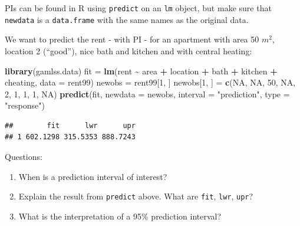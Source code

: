 \documentclass[
  ignorenonframetext,
]{beamer}
\newenvironment{Shaded}{\begin{snugshade}}{\end{snugshade}}
\newcommand{\AttributeTok}[1]{\textcolor[rgb]{0.13,0.29,0.53}{#1}}
\newcommand{\ConstantTok}[1]{\textcolor[rgb]{0.56,0.35,0.01}{#1}}
\newcommand{\DecValTok}[1]{\textcolor[rgb]{0.00,0.00,0.81}{#1}}
\newcommand{\FunctionTok}[1]{\textcolor[rgb]{0.13,0.29,0.53}{\textbf{#1}}}
\newcommand{\NormalTok}[1]{#1}
\newcommand{\OtherTok}[1]{\textcolor[rgb]{0.56,0.35,0.01}{#1}}
\newcommand{\SpecialCharTok}[1]{\textcolor[rgb]{0.81,0.36,0.00}{\textbf{#1}}}
\newcommand{\StringTok}[1]{\textcolor[rgb]{0.31,0.60,0.02}{#1}}
\begin{document}
\begin{frame}[fragile]
PIs can be found in R using \texttt{predict} on an \texttt{lm} object,
but make sure that \texttt{newdata} is a \texttt{data.frame} with the
same names as the original data.

We want to predict the rent - with PI - for an apartment with area 50
\(m^2\), location 2 (``good''), nice bath and kitchen and with central
heating:

\begin{Shaded}
\begin{Highlighting}[]
\FunctionTok{library}\NormalTok{(gamlss.data)}
\NormalTok{fit }\OtherTok{=} \FunctionTok{lm}\NormalTok{(rent }\SpecialCharTok{\textasciitilde{}}\NormalTok{ area }\SpecialCharTok{+}\NormalTok{ location }\SpecialCharTok{+}\NormalTok{ bath }\SpecialCharTok{+}\NormalTok{ kitchen }\SpecialCharTok{+}\NormalTok{ cheating, }\AttributeTok{data =}\NormalTok{ rent99)}
\NormalTok{newobs }\OtherTok{=}\NormalTok{ rent99[}\DecValTok{1}\NormalTok{, ]}
\NormalTok{newobs[}\DecValTok{1}\NormalTok{, ] }\OtherTok{=} \FunctionTok{c}\NormalTok{(}\ConstantTok{NA}\NormalTok{, }\ConstantTok{NA}\NormalTok{, }\DecValTok{50}\NormalTok{, }\ConstantTok{NA}\NormalTok{, }\DecValTok{2}\NormalTok{, }\DecValTok{1}\NormalTok{, }\DecValTok{1}\NormalTok{, }\DecValTok{1}\NormalTok{, }\ConstantTok{NA}\NormalTok{)}
\FunctionTok{predict}\NormalTok{(fit, }\AttributeTok{newdata =}\NormalTok{ newobs, }\AttributeTok{interval =} \StringTok{"prediction"}\NormalTok{, }\AttributeTok{type =} \StringTok{"response"}\NormalTok{)}
\end{Highlighting}
\end{Shaded}

\begin{verbatim}
##        fit      lwr      upr
## 1 602.1298 315.5353 888.7243
\end{verbatim}
\end{frame}

\begin{frame}[fragile]
\begin{block}{Questions:}
\label{questions}
\begin{enumerate}
\item
  {When is a prediction interval of interest? }
\item
  {Explain the result from \texttt{predict} above. What are
  \texttt{fit}, \texttt{lwr}, \texttt{upr}?}
\item
  {What is the interpretation of a 95\% prediction interval? }
\end{enumerate}
\end{block}
\end{frame}
\end{document}
